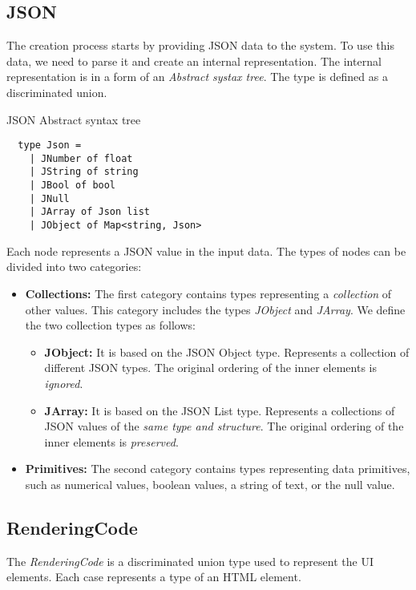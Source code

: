 \subsection{JSON}
The creation process starts by providing JSON data to the system.
To use this data, we need to parse it and create an internal representation.
The internal representation is in a form of an \emph{Abstract systax tree}.
The type is defined as a discriminated union.
\begin{listing}[H]
	\caption {JSON Abstract syntax tree}
	\begin{lstlisting}
  type Json =
    | JNumber of float
    | JString of string
    | JBool of bool
    | JNull
    | JArray of Json list
    | JObject of Map<string, Json>  
  \end{lstlisting}
\end{listing}

Each node represents a JSON value in the input data.
The types of nodes can be divided into two categories:
\begin{itemize}
	\item {\textbf{Collections:} The first category contains types representing a \emph{collection} of other values. This category includes the types \emph{JObject} and \emph{JArray}.
	      We define the two collection types as follows:
	      \begin{itemize}
		      \item \textbf{JObject:} It is based on the JSON Object type. Represents a collection of different JSON types. The original ordering of the inner elements is \emph{ignored}.
		      \item \textbf{JArray:} It is based on the JSON List type. Represents a collections of JSON values of the \emph{same type and structure}. The original ordering of the inner elements is \emph{preserved}. 
	      \end{itemize}
	      }
	\item \textbf{Primitives:} The second category contains types representing data primitives, such as numerical values, boolean values,
	      a string of text, or the null value.
\end{itemize}

\subsection{RenderingCode}
The \emph{RenderingCode} is a discriminated union type used to represent the UI elements.
Each case represents a type of an HTML element.

